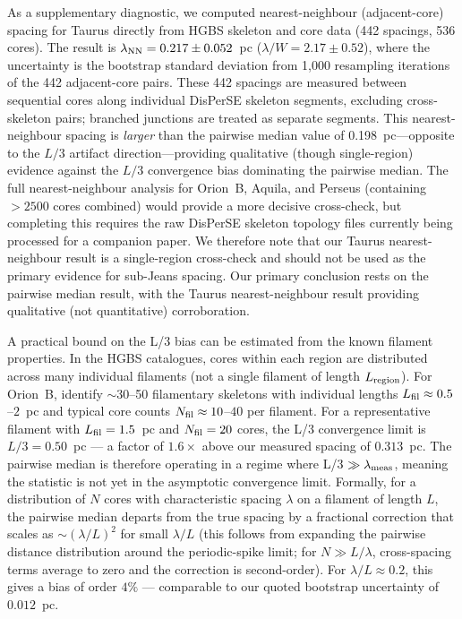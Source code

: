 \documentclass[twoside,twocolumn]{mnras}
\begin{document}
As a supplementary diagnostic, we computed nearest-neighbour (adjacent-core) spacing
for Taurus directly from HGBS skeleton and core data (442 spacings, 536 cores).
The result is $\lambda_{\rm NN} = 0.217 \pm 0.052$~pc ($\lambda/W = 2.17 \pm 0.52$),
where the uncertainty is the bootstrap standard deviation from 1,000 resampling
iterations of the 442 adjacent-core pairs. These 442 spacings are measured between sequential cores along individual DisPerSE skeleton segments, excluding cross-skeleton pairs; branched junctions are treated as separate segments. This nearest-neighbour spacing is
\textit{larger} than the pairwise median value of 0.198~pc---opposite to the
$L/3$ artifact direction---providing qualitative (though single-region) evidence
against the $L/3$ convergence bias dominating the pairwise median.
The full nearest-neighbour analysis for Orion~B, Aquila, and Perseus (containing
$>2500$ cores combined) would provide a more decisive cross-check, but completing
this requires the raw DisPerSE skeleton topology files currently being processed for
a companion paper. We therefore note that our Taurus nearest-neighbour result is a
single-region cross-check and should not be used as the primary evidence for sub-Jeans
spacing. Our primary conclusion rests on the pairwise median result, with the Taurus
nearest-neighbour result providing qualitative (not quantitative) corroboration.

A practical bound on the L/3 bias can be estimated from the known filament properties. In the HGBS catalogues, cores within each region are distributed across many individual filaments (not a single filament of length $L_{\rm region}$). For Orion~B, \citet{Konyves2020} identify $\sim$30--50 filamentary skeletons with individual lengths $L_{\rm fil} \approx 0.5$--$2$~pc and typical core counts $N_{\rm fil} \approx 10$--$40$ per filament. For a representative filament with $L_{\rm fil} = 1.5$~pc and $N_{\rm fil} = 20$ cores, the L/3 convergence limit is $L/3 = 0.50$~pc --- a factor of $1.6\times$ above our measured spacing of $0.313$~pc. The pairwise median is therefore operating in a regime where L/3 $\gg \lambda_{\rm meas}$, meaning the statistic is not yet in the asymptotic convergence limit. Formally, for a distribution of $N$ cores with characteristic spacing $\lambda$ on a filament of length $L$, the pairwise median departs from the true spacing by a fractional correction that scales as $\sim(\lambda/L)^2$ for small $\lambda/L$ (this follows from expanding the pairwise distance distribution around the periodic-spike limit; for $N \gg L/\lambda$, cross-spacing terms average to zero and the correction is second-order). For $\lambda/L \approx 0.2$, this gives a bias of order $4\%$ --- comparable to our quoted bootstrap uncertainty of $0.012$~pc.
\end{document}

